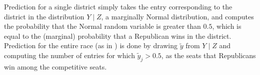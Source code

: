 \documentclass[12pt, letterpaper]{article}
\begin{document}
Prediction for a single district simply takes the entry corresponding to the
district in the distribution $Y \mid Z$, a marginally Normal distribution, and
computes the probability that the Normal random variable is greater than $0.5$,
which is equal to the (marginal) probability that a Republican wins in the
district. Prediction for the entire race (as in 
) is done by drawing
$\tilde y$ from $Y \mid Z$ and computing the number of entries for which
$\tilde y_j > 0.5$, as the seats that Republicans win among the competitive
seats.





\end{document}
